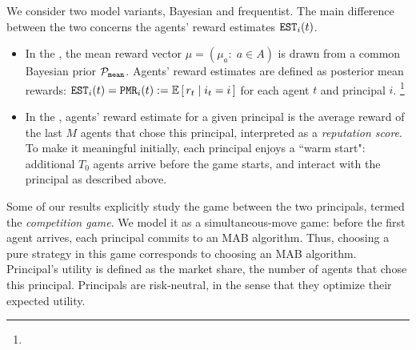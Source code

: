 
We consider two model variants, Bayesian and frequentist. The main difference between the two concerns the agents' reward estimates $\mathtt{EST}_i(t)$.

\begin{itemize}
\item In the \emph{\TheoryModel}, the mean reward vector $\mu = (\mu_a:\; a\in A)$ is drawn from a common Bayesian prior $\mathcal{P}_\mathtt{mean}$. 
    Agents' reward estimates are defined as posterior mean rewards:
        $\est_i(t) = \PMR_i(t) := \E\sbr{ r_t\mid i_t = i}$
    for each agent $t$ and principal $i$.%
\footnote{}


\item In the \emph{\ExptsModel}, agents' reward estimate for a given principal is the average reward of the last $M$ agents that chose this principal, interpreted as a \emph{reputation score}. To make it meaningful initially, each principal enjoys a ``warm start": additional $T_0$ agents arrive before the game starts, and interact with the principal as described above.

\end{itemize}

Some of our results explicitly study the game between the two principals, termed the \emph{competition game}. We model it as a simultaneous-move game: before the first agent arrives, each principal commits to an MAB algorithm. Thus, choosing a pure strategy in this game corresponds to choosing an MAB algorithm. Principal's utility is defined as the market share, \ie the number of agents that chose this principal. Principals are risk-neutral, in the sense that they optimize their expected utility.

 

